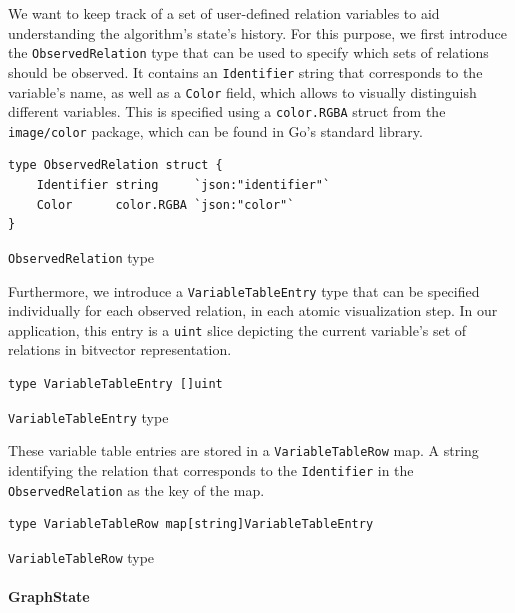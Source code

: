 We want to keep track of a set of user-defined relation variables to aid understanding the algorithm's state's history. For this purpose, we first introduce the \texttt{ObservedRelation} type that can be used to specify which sets of relations should be observed. It contains an \texttt{Identifier} string that corresponds to the variable's name, as well as a \texttt{Color} field, which allows to visually distinguish different variables. This is specified using a \texttt{color.RGBA} struct from the \texttt{image/color} package, which can be found in Go's standard library.

\begin{code}
\begin{verbatim}
type ObservedRelation struct {
    Identifier string     `json:"identifier"`
    Color      color.RGBA `json:"color"`
}
\end{verbatim}
\caption{\texttt{ObservedRelation} type}
\end{code}
\vspace{0.8cm}

Furthermore, we introduce a \texttt{VariableTableEntry} type that can be specified individually for each observed relation, in each atomic visualization step. In our application, this entry is a \texttt{uint} slice depicting the current variable's set of relations in bitvector representation.

\begin{code}
\begin{verbatim}
type VariableTableEntry []uint
\end{verbatim}
\caption{\texttt{VariableTableEntry} type}
\end{code}
\vspace{0.8cm}

These variable table entries are stored in a \texttt{VariableTableRow} map. A string identifying the relation that corresponds to the \texttt{Identifier} in the \texttt{ObservedRelation} as the key of the map.

\begin{code}
\begin{verbatim}
type VariableTableRow map[string]VariableTableEntry
\end{verbatim}
\caption{\texttt{VariableTableRow} type}
\end{code}
\vspace{0.8cm}

\paragraph{GraphState}

